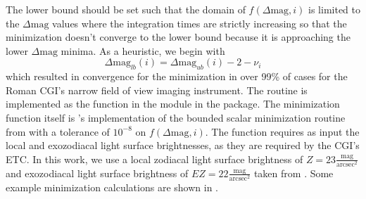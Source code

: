 The lower bound should be set such that the domain of $f\left(\Delta\textrm{mag},
i\right)$ is limited to the $\Delta\textrm{mag}$ values where the integration
times are strictly increasing so that the minimization doesn't converge to the
lower bound because it is approaching the lower $\Delta\textrm{mag}$ minima. As
a heuristic, we begin with
\begin{equation}
  \Delta\textrm{mag}_{lb}(i) = \Delta\textrm{mag}_{ub}(i) - 2 - \nu_i
  \label{eq:dMag_lb}
\end{equation}
which resulted in convergence for the minimization in over 99\% of cases for
the Roman CGI's narrow field of view imaging instrument. The routine is implemented
as the  function in the 
module in the  package. The minimization function itself
is 's \citep{virtanenSciPyFundamental2020} implementation of the
bounded scalar minimization routine from \citet{forsytheComputerMethods1977}
with a tolerance of $10^{-8}$ on $f(\Delta\textrm{mag}, i)$. The function
requires as input the local and exozodiacal light surface brightnesses,
as they are required by the CGI's ETC. In this work, we use a local zodiacal
light surface brightness of $Z=23
\frac{\textrm{mag}}{\textrm{arcsec}^2}$ and exozodiacal light surface
brightness of $EZ=22 \frac{\textrm{mag}}{\textrm{arcsec}^2}$
taken from \citet{starkMaximizingExoEarthCandidate2014}. Some example
minimization calculations are shown in .
